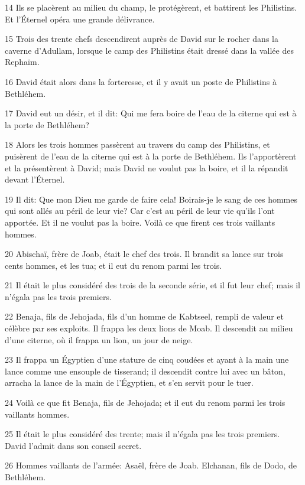 \par 14 Ils se placèrent au milieu du champ, le protégèrent, et battirent les Philistins. Et l'Éternel opéra une grande délivrance.
\par 15 Trois des trente chefs descendirent auprès de David sur le rocher dans la caverne d'Adullam, lorsque le camp des Philistins était dressé dans la vallée des Rephaïm.
\par 16 David était alors dans la forteresse, et il y avait un poste de Philistins à Bethléhem.
\par 17 David eut un désir, et il dit: Qui me fera boire de l'eau de la citerne qui est à la porte de Bethléhem?
\par 18 Alors les trois hommes passèrent au travers du camp des Philistins, et puisèrent de l'eau de la citerne qui est à la porte de Bethléhem. Ils l'apportèrent et la présentèrent à David; mais David ne voulut pas la boire, et il la répandit devant l'Éternel.
\par 19 Il dit: Que mon Dieu me garde de faire cela! Boirais-je le sang de ces hommes qui sont allés au péril de leur vie? Car c'est au péril de leur vie qu'ils l'ont apportée. Et il ne voulut pas la boire. Voilà ce que firent ces trois vaillants hommes.
\par 20 Abischaï, frère de Joab, était le chef des trois. Il brandit sa lance sur trois cents hommes, et les tua; et il eut du renom parmi les trois.
\par 21 Il était le plus considéré des trois de la seconde série, et il fut leur chef; mais il n'égala pas les trois premiers.
\par 22 Benaja, fils de Jehojada, fils d'un homme de Kabtseel, rempli de valeur et célèbre par ses exploits. Il frappa les deux lions de Moab. Il descendit au milieu d'une citerne, où il frappa un lion, un jour de neige.
\par 23 Il frappa un Égyptien d'une stature de cinq coudées et ayant à la main une lance comme une ensouple de tisserand; il descendit contre lui avec un bâton, arracha la lance de la main de l'Égyptien, et s'en servit pour le tuer.
\par 24 Voilà ce que fit Benaja, fils de Jehojada; et il eut du renom parmi les trois vaillants hommes.
\par 25 Il était le plus considéré des trente; mais il n'égala pas les trois premiers. David l'admit dans son conseil secret.
\par 26 Hommes vaillants de l'armée: Asaël, frère de Joab. Elchanan, fils de Dodo, de Bethléhem.
